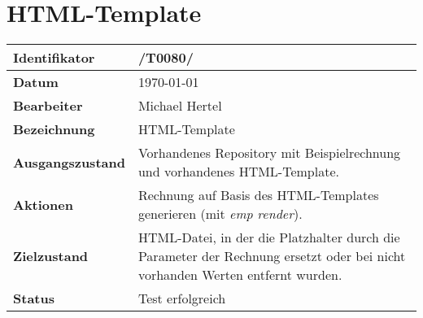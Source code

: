 
\section{HTML-Template}

\renewcommand{\arraystretch}{1.5}

\begin{center}
 \begin{tabular}{|p{}|p{}|}
	\hline
	\textbf{Identifikator}  & /T0080/ \\
	\hline
	\textbf{Datum} & \today \\
	\hline
	\textbf{Bearbeiter} & Michael Hertel \\
	\hline
	\textbf{Bezeichnung} & HTML-Template \\
	\hline
	\textbf{Ausgangszustand} &
		Vorhandenes Repository mit Beispielrechnung und vorhandenes HTML-Template. \\
	\hline
	\textbf{Aktionen} &
		Rechnung auf Basis des HTML-Templates generieren (mit \textit{emp render}). \\
	\hline
	\textbf{Zielzustand} &
		HTML-Datei, in der die Platzhalter durch die Parameter der Rechnung ersetzt oder bei nicht vorhanden Werten entfernt wurden. \\
	\hline
	\textbf{Status} & Test erfolgreich \\
	\hline
 \end{tabular}
\end{center}
